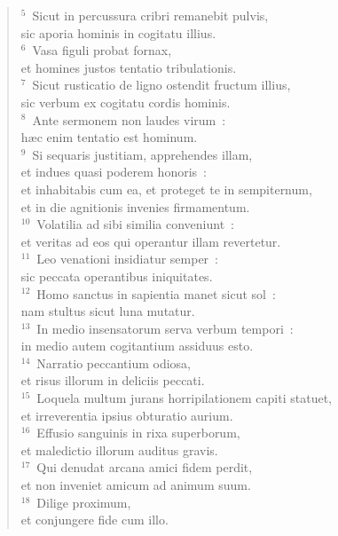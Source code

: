 \begin{verse}${}^{5}$~Sicut in percussura cribri remanebit pulvis,\\ sic aporia hominis in cogitatu illius.\\
${}^{6}$~Vasa figuli probat fornax,\\ et homines justos tentatio tribulationis.\\
${}^{7}$~Sicut rusticatio de ligno ostendit fructum illius,\\ sic verbum ex cogitatu cordis hominis.\\
${}^{8}$~Ante sermonem non laudes virum~:\\ h\ae c enim tentatio est hominum.\\
${}^{9}$~Si sequaris justitiam, apprehendes illam,\\ et indues quasi poderem honoris~:\\ et inhabitabis cum ea, et proteget te in sempiternum,\\ et in die agnitionis invenies firmamentum.\\
${}^{10}$~Volatilia ad sibi similia conveniunt~:\\ et veritas ad eos qui operantur illam revertetur.\\
${}^{11}$~Leo venationi insidiatur semper~:\\ sic peccata operantibus iniquitates.\\
${}^{12}$~Homo sanctus in sapientia manet sicut sol~:\\ nam stultus sicut luna mutatur.\\
${}^{13}$~In medio insensatorum serva verbum tempori~:\\ in medio autem cogitantium assiduus esto.\\
${}^{14}$~Narratio peccantium odiosa,\\ et risus illorum in deliciis peccati.\\
${}^{15}$~Loquela multum jurans horripilationem capiti statuet,\\ et irreverentia ipsius obturatio aurium.\\
${}^{16}$~Effusio sanguinis in rixa superborum,\\ et maledictio illorum auditus gravis.\\
${}^{17}$~Qui denudat arcana amici fidem perdit,\\ et non inveniet amicum ad animum suum.\\
${}^{18}$~Dilige proximum,\\ et conjungere fide cum illo.\\

\end{verse}

